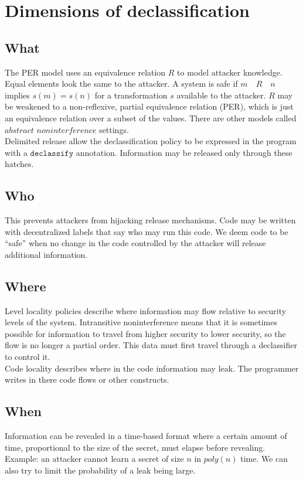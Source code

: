 \documentclass[11pt]{article}
\newcommand{\lookslike}{\quad R \quad}
\begin{document}
\section{Dimensions of declassification}
\subsection{What}
The PER model uses an equivalence relation $R$ to model attacker knowledge. Equal elements look the same to the attacker. A system is safe if $m\lookslike n$ implies $s(m) = s(n)$ for a transformation $s$ available to the attacker. $R$ may be weakened to a non-reflexive, partial equivalence relation (PER), which is just an equivalence relation over a subset of the values. There are other models called $\textit{abstract noninterference}$ settings. \\

Delimited release allow the declassification policy to be expressed in the program with a $\texttt{declassify}$ annotation. Information may be released only through these hatches.

\subsection{Who}
This prevents attackers from hijacking release mechanisms. Code may be written with decentralized labels that say who may run this code. We deem code to be ``safe'' when no change in the code controlled by the attacker will release additional information.

\subsection{Where}
Level locality policies describe where information may flow relative to security levels of the system. Intransitive noninterference means that it is sometimes possible for information to travel from higher security to lower security, so the flow is no longer a partial order. This data must first travel through a declassifier to control it. \\
Code locality describes where in the code information may leak. The programmer writes in there code flows or other constructs.

\subsection{When}
Information can be revealed in a time-based format where a certain amount of time, proportional to the size of the secret, must elapse before revealing. Example: an attacker cannot learn a secret of size $n$ in $poly(n)$ time. We can also try to limit the probability of a leak being large.
\end{document}
